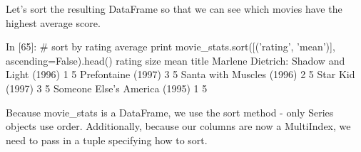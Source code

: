 \documentclass[11pt]{article} %
\begin{document}
Let's sort the resulting DataFrame so that we can see which movies have the highest average score.

In [65]:
# sort by rating average
print movie_stats.sort([('rating', 'mean')], ascending=False).head()
                                            rating      
                                              size  mean
title                                                   
Marlene Dietrich: Shadow and Light (1996)        1     5
Prefontaine (1997)                               3     5
Santa with Muscles (1996)                        2     5
Star Kid (1997)                                  3     5
Someone Else's America (1995)                    1     5

Because movie_stats is a DataFrame, we use the sort method - only Series objects use order. Additionally, because our columns are now a MultiIndex, we need to pass in a tuple specifying how to sort.

\end{document}
